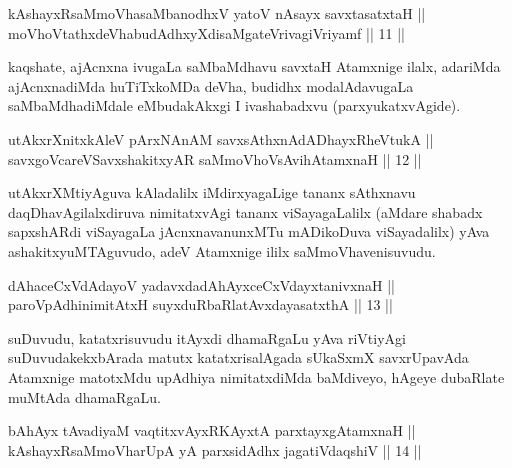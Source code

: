 \begin{shl}
kAshayxRsaMmoVhasaMbanodhxV yatoV nAsayx savxtasatxtaH || \\
moVhoVtathxdeVhabudAdhxyXdisaMgateVrivagiVriyamf \hfill || 11 ||
 
\end{shl}

\begin{artha}
kaqshate, ajAcnxna ivugaLa saMbaMdhavu savxtaH Atamxnige ilalx,
adariMda ajAcnxnadiMda huTiTxkoMDa deVha, budidhx modalAdavugaLa
saMbaMdhadiMdale eMbudakAkxgi I ivashabadxvu (parxyukatxvAgide).
\end{artha}


\begin{shl}
utAkxrXnitxkAleV pArxNAnAM savxsAthxnAdADhayxRheVtukA || \\
savxgoVcareVSavxshakitxyAR saMmoVhoV\s sAvihA\s \s tamxnaH \hfill || 12 ||
  
\end{shl}

\begin{artha}
utAkxrXMtiyAguva kAladalilx iMdirxyagaLige tananx sAthxnavu
daqDhavAgilalxdiruva nimitatxvAgi tananx viSayagaLalilx (aMdare
shabadx sapxshARdi viSayagaLa jAcnxnavanunxMTu mADikoDuva
viSayadalilx) yAva ashakitxyuMTAguvudo, adeV Atamxnige ililx
saMmoVhavenisuvudu.
\end{artha}


\begin{shl}
dAhaceCxVdAdayoV yadavxdadAhAyxceCxVdayxtanivxnaH || \\
paroVpAdhinimitAtxH suyxduRbaRlatAvxdayasatxthA \hfill || 13 ||
  
\end{shl}

\begin{artha}
suDuvudu, katatxrisuvudu itAyxdi dhamaRgaLu yAva riVtiyAgi
suDuvudakekxbArada matutx katatxrisalAgada sUkaSxmX savxrUpavAda
Atamxnige matotxMdu upAdhiya nimitatxdiMda baMdiveyo, hAgeye dubaRlate
muMtAda dhamaRgaLu.
\end{artha}


\begin{shl}
bAhAyx tAvadiyaM vaqtitxvAyxRKAyxtA parxtayxgAtamxnaH || \\
kAshayxRsaMmoVharUpA yA parxsidAdhx jagatiVdaqshiV \hfill || 14 ||
  
\end{shl}


